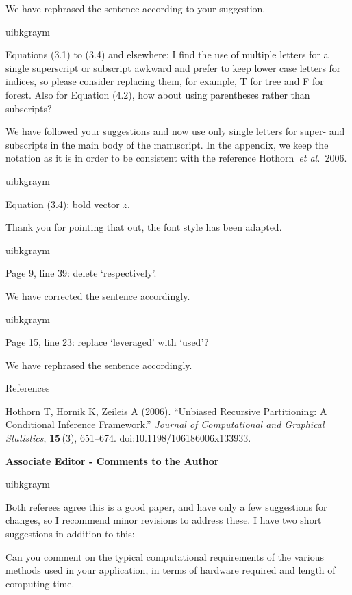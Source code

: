 \documentclass[english, noconfig]{uibklttr}
\newcommand{\section}[1]{{\Large{\textbf{#1}}}}
\newenvironment{re}{
    \begin{color}{uibkgraym}
        \itshape
}{
    \end{color}
}
\begin{document}
We have rephrased the sentence according to your suggestion.

\vspace{0.5em}
\begin{re}
Equations (3.1) to (3.4) and elsewhere: I find the use of multiple letters for a single superscript or subscript awkward and prefer to keep lower case letters for indices, so please consider replacing them, for example, T for tree and F for forest. Also for Equation (4.2), how about using parentheses rather than subscripts?
\end{re}

We have followed your suggestions and now use only single letters for super-
and subscripts in the main body of the manuscript. In the appendix, we keep the
notation as it is in order to be consistent with the reference Hothorn~\emph{et al.}~2006.

\vspace{0.5em}
\begin{re}
Equation (3.4): bold vector $z$.
\end{re}

Thank you for pointing that out, the font style has been adapted.

\vspace{0.5em}
\begin{re}
Page 9, line 39: delete `respectively'.
\end{re}

We have corrected the sentence accordingly.

\vspace{0.5em}
\begin{re}
Page 15, line 23: replace `leveraged' with `used'?
\end{re}

We have rephrased the sentence accordingly.

\vspace{0.5cm}
References

Hothorn T, Hornik K, Zeileis A (2006). ``Unbiased Recursive Partitioning: A Conditional
Inference Framework.'' \emph{Journal of Computational and Graphical Statistics}, \textbf{15}\,(3), 651--674.
doi:10.1198/106186006x133933.

\newpage

\section{Associate Editor - Comments to the Author}

\begin{re}
Both referees agree this is a good paper, and have only a few suggestions for
changes, so I recommend minor revisions to address these. I have two short suggestions in addition to this:

Can you comment on the typical computational requirements of the various
methods used in your application, in terms of hardware required and length of
computing time.
\end{re}
\end{document}
